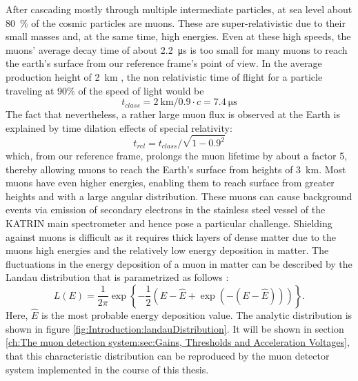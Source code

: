 	After cascading mostly through multiple intermediate particles, at sea level about \SI{80}{\percent} of the cosmic particles are muons. These are super-relativistic due to their small masses and, at the same time, high energies. Even at these high speeds, the muons' average decay time of about \SI{2.2}{\micro\second} \cite{muonLifetime} is too small for many muons to reach the earth's surface from our reference frame's point of view. In the average production height of \SI{2}{\kilo\meter} \cite{muonProductionHeight}, the non relativistic time of flight for a particle traveling at 90\% of the speed of light would be 
    \begin{equation}
	t_{class} = \SI{2}{\kilo\meter} / 0.9\cdot c = \SI{7.4}{\micro\second}
    \end{equation}
    The fact that nevertheless, a rather large muon flux is observed at the Earth is explained by time dilation effects of special relativity:
    \begin{equation}
    	t_{rel} = t_{class} / \sqrt{1-0.9^2}
    \end{equation}
    which, from our reference frame, prolongs the muon lifetime by about a factor 5, thereby allowing muons to reach the Earth's surface from heights of \SI{3}{\kilo\meter}. Most muons have even higher energies, enabling them to reach surface from greater heights and with a large angular distribution.
    These muons can cause background events via emission of secondary electrons in the stainless steel vessel of the KATRIN main spectrometer and hence pose a particular challenge. Shielding against muons is difficult as it requires thick layers of dense matter due to the muons high energies and the relatively low energy deposition in matter.
    The fluctuations in the energy deposition of a muon in matter can be described by the Landau distribution that is parametrized as follows \cite{Grupen}:
    \begin{equation}
    	L(E) = \frac{1}{2\pi}\exp{\left\{-\frac{1}{2}\left(E- \hat E + \exp \left(-(E-\hat E)\right)\right)\right\}}.
    \end{equation}
	Here, $\hat E$ is the most probable energy deposition value. The analytic distribution is shown in figure \ref{fig:Introduction:landauDistribution}. It will be shown in section \ref{ch:The muon detection system:sec:Gains, Thresholds and Acceleration Voltages}, that this characteristic distribution can be reproduced by the muon detector system implemented in the course of this thesis.
